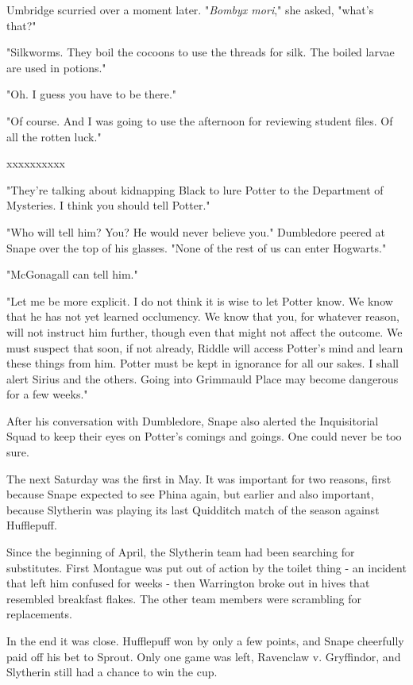\documentclass[a4paper,11pt]{article}
\begin{document}
Umbridge scurried over a moment later. "\emph{Bombyx mori}," she asked, "what's that?"

"Silkworms. They boil the cocoons to use the threads for silk. The boiled larvae are used in potions."

"Oh. I guess you have to be there."

"Of course. And I was going to use the afternoon for reviewing student files. Of all the rotten luck."

xxxxxxxxxx

"They're talking about kidnapping Black to lure Potter to the Department of Mysteries. I think you should tell Potter."

"Who will tell him? You? He would never believe you." Dumbledore peered at Snape over the top of his glasses. "None of the rest of us can enter Hogwarts."

"McGonagall can tell him."

"Let me be more explicit. I do not think it is wise to let Potter know. We know that he has not yet learned occlumency. We know that you, for whatever reason, will not instruct him further, though even that might not affect the outcome. We must suspect that soon, if not already, Riddle will access Potter's mind and learn these things from him. Potter must be kept in ignorance for all our sakes. I shall alert Sirius and the others. Going into Grimmauld Place may become dangerous for a few weeks."

After his conversation with Dumbledore, Snape also alerted the Inquisitorial Squad to keep their eyes on Potter's comings and goings. One could never be too sure.

The next Saturday was the first in May. It was important for two reasons, first because Snape expected to see Phina again, but earlier and also important, because Slytherin was playing its last Quidditch match of the season against Hufflepuff.

Since the beginning of April, the Slytherin team had been searching for substitutes. First Montague was put out of action by the toilet thing - an incident that left him confused for weeks - then Warrington broke out in hives that resembled breakfast flakes. The other team members were scrambling for replacements.

In the end it was close. Hufflepuff won by only a few points, and Snape cheerfully paid off his bet to Sprout. Only one game was left, Ravenclaw v. Gryffindor, and Slytherin still had a chance to win the cup.
\end{document}
